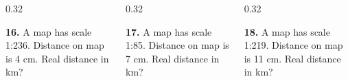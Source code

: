 \documentclass[aspectratio=169,12pt]{beamer}
\newcommand{\MMProblem}[2]{\begin{MMProblemCard}\raggedright\small\textbf{#1.} #2\par\end{MMProblemCard}}
\begin{document}
\begin{frame}[t]
\vspace{0.05em}
\begin{columns}[T,onlytextwidth]
\begin{column}{0.32\textwidth}\MMProblem{16}{A map has scale 1:236. Distance on map is 4 cm. Real distance in km?}\end{column}
\begin{column}{0.32\textwidth}\MMProblem{17}{A map has scale 1:85. Distance on map is 7 cm. Real distance in km?}\end{column}
\begin{column}{0.32\textwidth}\MMProblem{18}{A map has scale 1:219. Distance on map is 11 cm. Real distance in km?}\end{column}
\end{columns}
\end{frame}
\end{document}
